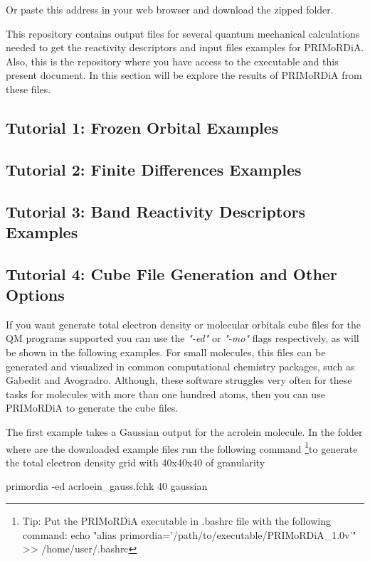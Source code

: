 \documentclass[a4paper,11pt]{refart}
\begin{document}
Or paste this address in your web browser and download the zipped folder.

This repository contains output files for several quantum mechanical calculations needed to get the reactivity descriptors and input files examples for PRIMoRDiA. Also, this is the repository where you have access to the executable and this present document. In this section will be explore the results of PRIMoRDiA from these files.

\subsection{Tutorial 1: Frozen Orbital Examples }


\subsection{Tutorial 2: Finite Differences Examples }


\subsection{Tutorial 3: Band Reactivity Descriptors Examples }


\subsection{Tutorial 4: Cube File Generation and Other Options }

If you want generate total electron density or molecular orbitals cube files for the QM programs supported you can use the \emph{"-ed"} or \emph{"-mo"} flags respectively, as will be shown in the following examples. For small molecules, this files can be generated and visualized in common computational chemistry packages, such as Gabedit and Avogradro. Although, these software struggles very often for these tasks for molecules with more than one hundred atoms, then you can use PRIMoRDiA to generate the cube files. 

The first example takes a Gaussian output for the acrolein molecule. In the folder where are the downloaded example files run the following command \footnote{Tip: Put the PRIMoRDiA executable in .bashrc file with the following command: echo "alias primordia='/path/to/executable/PRIMoRDiA\_1.0v'" >> /home/user/.bashrc }to generate the total electron density grid with 40x40x40 of granularity 

\hspace*{-\leftmarginwidth}
\begin{minipage}{\fullwidth}
	\begin{commandshell}primordia -ed acrloein_gauss.fchk 40 gaussian\end{commandshell}
\end{minipage}
\end{document}

